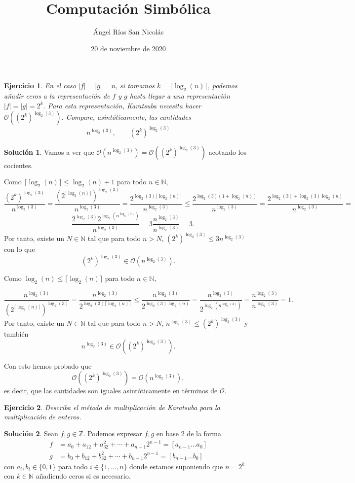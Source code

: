 \documentclass[10pt,a4paper]{article}
\author{Ángel Ríos San Nicolás}
\title{Computación Simbólica}
\date{20 de noviembre de 2020}
\theoremstyle{plain}
\newtheorem{ejer}{Ejercicio}
\theoremstyle{definition}
\newtheorem*{sol}{Solución}
\begin{document}
\maketitle
\begin{ejer} En el caso $|f|=|g|=n$, si tomamos $k=\lceil\log_2(n) \rceil$, podemos añadir ceros a la representación de $f$ y $g$ hasta llegar a una representación $|f|=|g|=2^k$. Para esta representación, Karatsuba necesita hacer $\mathcal{O}((2^k)^{\log_2(3)})$. Compare, asintóticamente, las cantidades 
$$n^{\log_2(3)},\qquad (2^k)^{\log_2(3)}$$
\end{ejer}
\begin{sol}
Vamos a ver que $\mathcal{O}\left(n^{\log_2(3)}\right)=\mathcal{O}\left((2^k)^{\log_2(3)}\right)$ acotando los cocientes.

Como $\lceil\log_2(n)\rceil\leq \log_2(n)+1$ para todo $n\in \mathbb{N}$,
$$\frac{(2^k)^{\log_2(3)}}{n^{\log_2(3)}}
= \frac{\left(2^{\lceil \log_2(n)\rceil}\right)^{\log_2(3)}}{n^{\log_2(3)}}
 =  \frac{2^{\log_2(3)\lceil\log_2(n)\rceil}}{n^{\log_2(3)}}
\leq  \frac{2^{\log_2(3)(1+\log_2(n))}}{n^{\log_2(3)}}
 =  \frac{2^{\log_2(3)+\log_2(3)\log_2(n)}}{n^{\log_2(3)}}=$$ $$
 =  \frac{2^{\log_2(3)}2^{\log_2\left(n^{\log_2(3)}\right)}}{n^{\log_2(3)}}
=  3\frac{n^{\log_2(3)}}{n^{\log_2(3)}}=3.$$
Por tanto, existe un $N\in\mathbb{N}$ tal que para todo $n>N$, $(2^k)^{\log_2(3)}\leq 3n^{\log_2(3)}$ 
con lo que 
$$(2^k)^{\log_2(3)}\in\mathcal{O}\left(n^{\log_2(3)}\right).$$

Como $\log_2(n)\leq \lceil\log_2(n)\rceil$ para todo $n\in\mathbb{N}$,

$$\frac{n^{\log_2(3)}}{\left(2^{\lceil\log_2(n)\rceil}\right)^{\log_2(3)}}=\frac{n^{\log_2(3)}}{2^{\log_2(3)\lceil\log_2(n)\rceil}}\leq \frac{n^{\log_2(3)}}{2^{\log_2(3)\log_2(n)}}=\frac{n^{\log_2(3)}}{2^{\log_2\left(n^{\log_2(3)}\right)}}=\frac{n^{\log_2(3)}}{n^{\log_2(3)}}=1.$$
Por tanto, existe un $N\in\mathbb{N}$ tal que para todo $n>N$, $n^{\log_2(3)}\leq (2^k)^{\log_2(3)}$ y también $$n^{\log_2(3)}\in\mathcal{O}\left((2^k)^{\log_2(3)}\right).$$

Con esto hemos probado que 
$$\mathcal{O}\left((2^k)^{\log_2(3)}\right)=\mathcal{O}\left(n^{\log_2(3)}\right),$$
es decir, que las cantidades son iguales asintóticamente en términos de $\mathcal{O}$.
\end{sol}
\begin{ejer} Describa el método de multiplicación de Karatsuba para la multiplicación de enteros.
\end{ejer}
\begin{sol}
Sean $f,g\in\mathbb{Z}$. Podemos expresar $f,g$ en base $2$ de la forma
\begin{align*}
f &=a_0+a_12+a_32^2+\cdots+a_{n-1}2^{n-1} =[a_{n-1}\ldots a_0]\\
g &=b_0+b_12+b_32^2+\cdots+b_{n-1}2^{n-1} =[b_{n-1}\ldots b_0]
\end{align*}
con $a_i,b_i\in\{0,1\}$ para todo $i\in\{1,\ldots, n\}$ donde estamos suponiendo que $n=2^{k}$ con $k\in\mathbb{N}$ añadiendo ceros si es necesario.
\end{sol}
\end{document}
